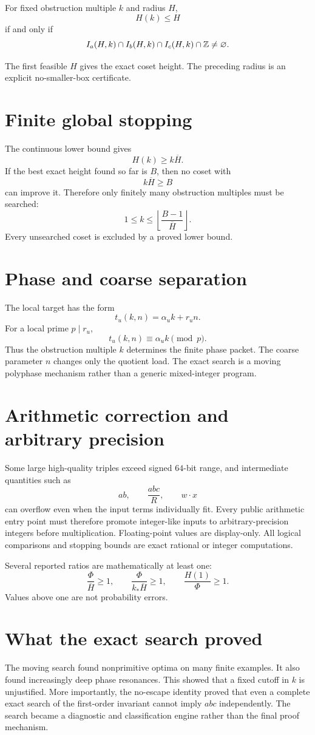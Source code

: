 \begin{theorem}
For fixed obstruction multiple $k$ and radius $H$,
\[
 H(k)\le H
\]
if and only if
\[
 I_a(H,k)
 \cap
 I_b(H,k)
 \cap
 I_c(H,k)
 \cap\mathbb Z
 \neq\varnothing.
\]
\end{theorem}

The first feasible $H$ gives the exact coset height. The preceding radius is an explicit no-smaller-box certificate.

\section{Finite global stopping}
The continuous lower bound gives
\[
 H(k)\ge k\overline H.
\]
If the best exact height found so far is $B$, then no coset with
\[
 k\overline H\ge B
\]
can improve it. Therefore only finitely many obstruction multiples must be searched:
\[
 \boxed{
 1\le k\le
 \left\lfloor\frac{B-1}{\overline H}\right\rfloor.
 }
\]
Every unsearched coset is excluded by a proved lower bound.

\section{Phase and coarse separation}
The local target has the form
\[
 t_u(k,n)=\alpha_uk+r_un.
\]
For a local prime $p\mid r_u$,
\[
 t_u(k,n)\equiv\alpha_uk\pmod p.
\]
Thus the obstruction multiple $k$ determines the finite phase packet. The coarse parameter $n$ changes only the quotient load. The exact search is a moving polyphase mechanism rather than a generic mixed-integer program.

\section{Arithmetic correction and arbitrary precision}
Some large high-quality triples exceed signed $64$-bit range, and intermediate quantities such as
\[
 ab,
 \qquad
 \frac{abc}{R},
 \qquad
 w\cdot x
\]
can overflow even when the input terms individually fit. Every public arithmetic entry point must therefore promote integer-like inputs to arbitrary-precision integers before multiplication. Floating-point values are display-only. All logical comparisons and stopping bounds are exact rational or integer computations.

Several reported ratios are mathematically at least one:
\[
 \frac{\Phi}{\overline H}\ge1,
 \qquad
 \frac{\Phi}{k_*\overline H}\ge1,
 \qquad
 \frac{H(1)}{\Phi}\ge1.
\]
Values above one are not probability errors.

\section{What the exact search proved}
The moving search found nonprimitive optima on many finite examples. It also found increasingly deep phase resonances. This showed that a fixed cutoff in $k$ is unjustified. More importantly, the no-escape identity proved that even a complete exact search of the first-order invariant cannot imply $abc$ independently. The search became a diagnostic and classification engine rather than the final proof mechanism.

